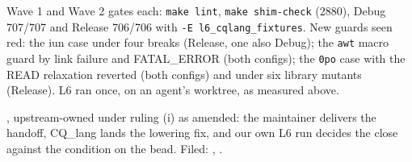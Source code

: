 Wave 1 and Wave 2 gates each: \texttt{make lint}, \texttt{make shim-check}
(2880), Debug 707/707 and Release 706/706 with \texttt{-E
l6\_cqlang\_fixtures}.  New guards seen red: the iun case under four breaks
(Release, one also Debug); the \texttt{awt} macro guard by link failure and
FATAL\_ERROR (both configs); the \texttt{0po} case with the READ relaxation
reverted (both configs) and under six library mutants (Release).  L6 ran once,
on an agent's worktree, as measured above.

, upstream-owned under ruling (i) as amended: the maintainer
delivers the handoff, CQ\_lang lands the lowering fix, and our own L6 run
decides the close against the condition on the bead.  Filed: ,
.
